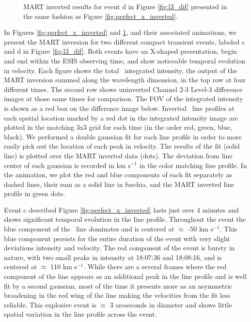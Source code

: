         \begin{figure}[htb!]
    	\centering
    	\caption{MART inverted results for event d in Figure \ref{fig:l3_dif} presented in the same fashion as Figure \ref{fig:perfect_x_inverted}.}
    	\label{fig:other_x_inverted}
    	\end{figure}
    	
    	In Figures \ref{fig:perfect_x_inverted} and \ref{fig:other_x_inverted}, and their associated animations, we present the MART inversion for two different compact transient events, labeled c and d in Figure \ref{fig:l3_dif}.
    	Both events have an X-shaped presentation, begin and end within the ESIS observing time, and show noticeable temporal evolution in velocity.
		Each figure shows the total \ov \ integrated intensity, the output of the MART inversion summed along the wavelength dimension, in the top row  at four different times. 
		The second row shows uninverted Channel 2-3 Level-3 difference images at those same times for comparison.
		The FOV of the integrated intensity is shown as a red box on the difference image below. 
		Inverted \ov \ line profiles at each spatial location marked by a red dot in the integrated intensity image are plotted in the matching 3x3 grid for each time (in the order red, green, blue, black).
		We performed a double gaussian fit for each line profile in order to more easily pick out the location of each peak in velocity.
		The results of the fit (solid line) is plotted over the MART inverted data (dots).
		The deviation from line center of each gaussian is recorded in km s$^{-1}$ in the color matching line profile.
		In the animation, we plot the red and blue components of each fit separately as dashed lines, their sum as a solid line in fuschia, and the MART inverted line profile in  green dots.
		
		Event c described Figure \ref{fig:perfect_x_inverted} lasts just over 4 minutes and shows significant temporal evolution in the line profile.
		Throughout the event the blue component of the \ov \ line dominates and is centered at $\approx$ -50 km s$^{-1}$.
		This blue component persists for the entire duration of the event with very slight deviations intensity and velocity.
		The red component of the event is bursty in nature, with two small peaks in intensity at 18:07:36 and 18:08:16, and is centered at $\approx$ 110 km s$^{-1}$.
		While there are a several frames where the red component of the line appears as an additional peak in the line profile and is well fit by a second gaussian, most of the time it presents more as an asymmetric broadening in the red wing of the line making the velocities from the fit less reliable.
		This explosive event is $\approx$ 3 arcseconds in diameter and shows little spatial variation in the line profile across the event.
		
